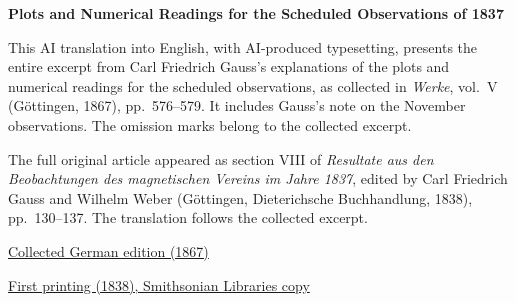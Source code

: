 \clearpage
\thispagestyle{empty}
\begin{center}\Large\textbf{Plots and Numerical Readings for the Scheduled Observations of 1837}\end{center}

This AI translation into English, with AI-produced typesetting, presents the entire excerpt from Carl Friedrich Gauss’s explanations of the plots and numerical readings for the scheduled observations, as collected in \textit{Werke}, vol.~V (Göttingen, 1867), pp.~576--579. It includes Gauss’s note on the November observations. The omission marks belong to the collected excerpt.

The full original article appeared as section VIII of \textit{Resultate aus den Beobachtungen des magnetischen Vereins im Jahre 1837}, edited by Carl Friedrich Gauss and Wilhelm Weber (Göttingen, Dieterichsche Buchhandlung, 1838), pp.~130--137. The translation follows the collected excerpt.

\medskip\noindent
\href{https://gdz.sub.uni-goettingen.de/id/PPN236006339}{Collected German edition (1867)}\par
\noindent\href{https://archive.org/details/ResultateausdenBd2Gaus/page/n137/mode/2up}{First printing (1838), Smithsonian Libraries copy}
\clearpage
